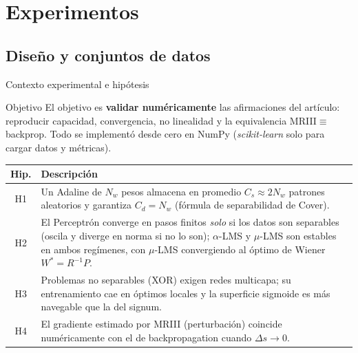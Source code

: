 \documentclass[aspectratio=169, 11pt, xcolor={dvipsnames,table}]{beamer}
\newcommand{\azul}[1]{\textcolor{UsachAzul}{#1}}
\begin{document}
\section{Experimentos}

\subsection{Diseño y conjuntos de datos}
\begin{frame}{Contexto experimental e hipótesis}

\begin{block}{Objetivo}
El objetivo es \textbf{validar numéricamente} las afirmaciones del artículo: reproducir capacidad,
convergencia, no linealidad y la equivalencia MRIII$\equiv$backprop. Todo se implementó
\azul{desde cero en NumPy} (\emph{scikit-learn} solo para cargar datos y métricas).
\end{block}


\vspace{4pt}
{\footnotesize
\renewcommand{\arraystretch}{1.3}
\begin{tabular}{@{}c p{}@{}}
\toprule
\textbf{Hip.} & \textbf{Descripción} \\
\midrule
\azul{H1} & Un Adaline de $N_w$ pesos almacena en promedio $C_s\approx 2N_w$ patrones aleatorios y garantiza $C_d=N_w$ (fórmula de separabilidad de Cover). \\
\azul{H2} & El Perceptr\'on converge en pasos finitos \emph{solo} si los datos son separables (oscila y diverge en norma si no lo son); $\alpha$-LMS y $\mu$-LMS son estables en ambos reg\'imenes, con $\mu$-LMS convergiendo al \'optimo de Wiener $W^*=R^{-1}P$. \\
\azul{H3} & Problemas no separables (XOR) exigen redes multicapa; su entrenamiento cae en óptimos locales y la superficie sigmoide es más navegable que la del signum. \\
\azul{H4} & El gradiente estimado por MRIII (perturbación) coincide numéricamente con el de backpropagation cuando $\Delta s\to 0$. \\
\bottomrule
\end{tabular}}
\end{frame}
\end{document}
